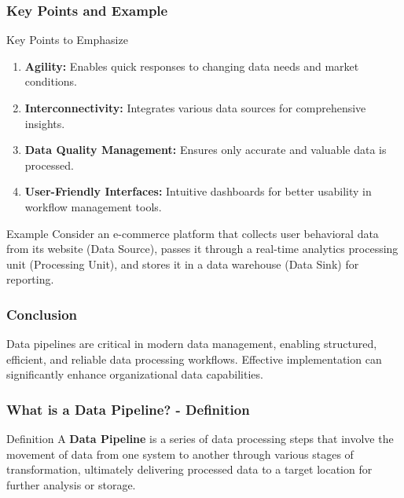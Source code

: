 \documentclass[aspectratio=169]{beamer}
\begin{document}
\begin{frame}[fragile]
    \frametitle{Key Points and Example}
    \begin{block}{Key Points to Emphasize}
        \begin{enumerate}
            \item \textbf{Agility:} Enables quick responses to changing data needs and market conditions.
            \item \textbf{Interconnectivity:} Integrates various data sources for comprehensive insights.
            \item \textbf{Data Quality Management:} Ensures only accurate and valuable data is processed.
            \item \textbf{User-Friendly Interfaces:} Intuitive dashboards for better usability in workflow management tools.
        \end{enumerate}
    \end{block}

    \begin{block}{Example}
        Consider an e-commerce platform that collects user behavioral data from its website (Data Source), passes it through a real-time analytics processing unit (Processing Unit), and stores it in a data warehouse (Data Sink) for reporting.
    \end{block}
\end{frame}

\begin{frame}[fragile]
    \frametitle{Conclusion}
    Data pipelines are critical in modern data management, enabling structured, efficient, and reliable data processing workflows. Effective implementation can significantly enhance organizational data capabilities.
\end{frame}

\begin{frame}[fragile]
    \frametitle{What is a Data Pipeline? - Definition}
    \begin{block}{Definition}
        A \textbf{Data Pipeline} is a series of data processing steps that involve the movement of data from one system to another through various stages of transformation, ultimately delivering processed data to a target location for further analysis or storage.
    \end{block}
\end{frame}
\end{document}
